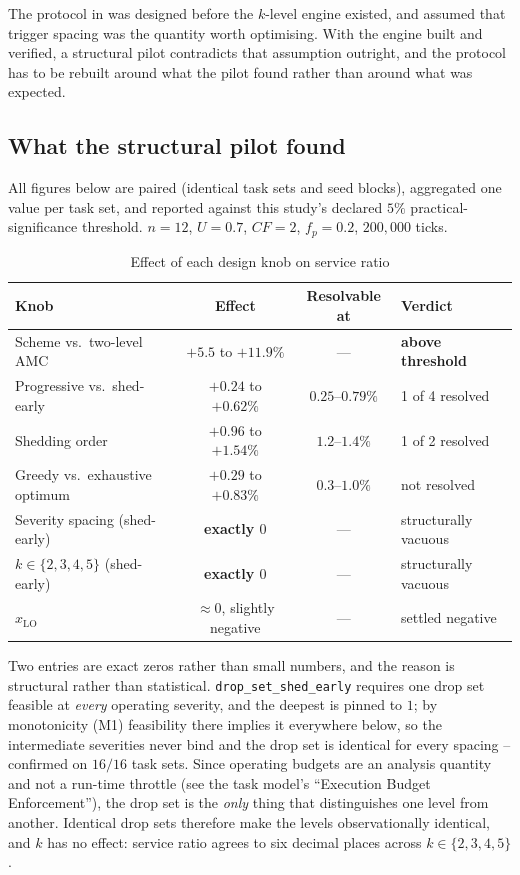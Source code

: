 The protocol in  was designed before
the $k$-level engine existed, and assumed that trigger spacing was the quantity
worth optimising. With the engine built and verified, a structural pilot
contradicts that assumption outright, and the protocol has to be rebuilt around
what the pilot found rather than around what was expected.

\subsection{What the structural pilot found}
\label{sec:structural-pilot}

All figures below are paired (identical task sets and seed blocks), aggregated
one value per task set, and reported against this study's declared $5\%$
practical-significance threshold. $n = 12$, $U = 0.7$, $CF = 2$, $f_p = 0.2$,
$200{,}000$ ticks.

\begin{table}[h]
\centering
\caption{Effect of each design knob on service ratio}
\label{tab:knobs}
\begin{tabular}{lccl}
\toprule
Knob & Effect & Resolvable at & Verdict \\
\midrule
Scheme vs.\ two-level AMC   & $+5.5$ to $+11.9\%$ & --- & \textbf{above threshold} \\
Progressive vs.\ shed-early & $+0.24$ to $+0.62\%$ & $0.25$--$0.79\%$ & 1 of 4 resolved \\
Shedding order              & $+0.96$ to $+1.54\%$ & $1.2$--$1.4\%$ & 1 of 2 resolved \\
Greedy vs.\ exhaustive optimum & $+0.29$ to $+0.83\%$ & $0.3$--$1.0\%$ & not resolved \\
Severity spacing (shed-early) & \textbf{exactly $0$} & --- & structurally vacuous \\
$k \in \{2,3,4,5\}$ (shed-early) & \textbf{exactly $0$} & --- & structurally vacuous \\
$x_{\mathrm{LO}}$             & $\approx 0$, slightly negative & --- & settled negative \\
\bottomrule
\end{tabular}
\end{table}

Two entries are exact zeros rather than small numbers, and the reason is
structural rather than statistical. \texttt{drop\_set\_shed\_early} requires one
drop set feasible at \emph{every} operating severity, and the deepest is pinned
to $1$; by monotonicity (M1) feasibility there implies it everywhere below, so
the intermediate severities never bind and the drop set is identical for every
spacing -- confirmed on $16/16$ task sets. Since operating budgets are an
analysis quantity and not a run-time throttle (see the task model's
``Execution Budget Enforcement''), the drop set is the \emph{only} thing that
distinguishes one level from another. Identical drop sets therefore make the levels observationally
identical, and $k$ has no effect: service ratio agrees to six decimal places
across $k \in \{2,3,4,5\}$.

